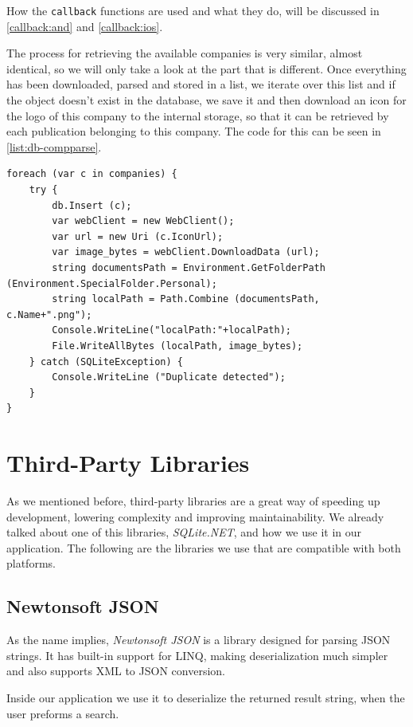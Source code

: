 How the \texttt{callback} functions are used and what they do, will be discussed in \autoref{callback:and} and \autoref{callback:ios}.

The process for retrieving the available companies is very similar, almost identical, so we will only take a look at the part that is different. Once everything has been downloaded, parsed and stored in a list, we iterate over this list and if the object doesn't exist in the database, we save it and then download an icon for the logo of this company to the internal storage, so that it can be retrieved by each publication belonging to this company. The code for this can be seen in \autoref{list:db-compparse}.

\begin{lstlisting}[frame=lt,caption=CompaniesParser.cs,label={list:db-compparse}]
foreach (var c in companies) {
	try {
		db.Insert (c);
		var webClient = new WebClient();
		var url = new Uri (c.IconUrl);
		var image_bytes = webClient.DownloadData (url);
		string documentsPath = Environment.GetFolderPath (Environment.SpecialFolder.Personal);	
		string localPath = Path.Combine (documentsPath, c.Name+".png");
		Console.WriteLine("localPath:"+localPath);
		File.WriteAllBytes (localPath, image_bytes);		
	} catch (SQLiteException) {
		Console.WriteLine ("Duplicate detected");					
	}
}
\end{lstlisting}


\section{Third-Party Libraries}

As we mentioned before, third-party libraries are a great way of speeding up development, lowering complexity and improving maintainability. We already talked about one of this libraries, \textit{SQLite.NET}, and how we use it in our application. The following are the libraries we use that are compatible with both platforms. 

\subsection{Newtonsoft JSON}

As the name implies, \textit{Newtonsoft JSON} is a library designed for parsing \ac{JSON} strings. It has built-in support for \ac{LINQ}, making deserialization much simpler and also supports \ac{XML} to \ac{JSON} conversion.

Inside our application we use it to deserialize the returned result string, when the user preforms a search.

